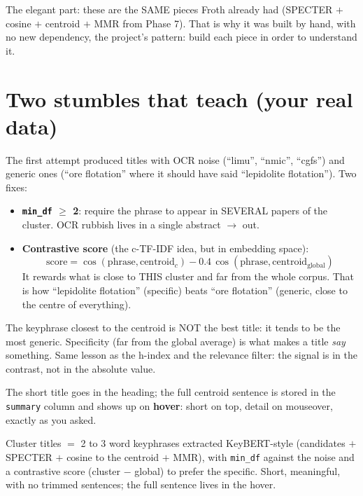 \documentclass[11pt,a4paper]{article}
\begin{document}
The elegant part: these are the SAME pieces Froth already had (SPECTER $+$ cosine $+$ centroid
$+$ MMR from Phase 7). That is why it was built by hand, with no new dependency, the project's
pattern: build each piece in order to understand it.

\section{Two stumbles that teach (your real data)}

The first attempt produced titles with OCR noise (``limu'', ``nmic'', ``cgfs'') and generic ones
(``ore flotation'' where it should have said ``lepidolite flotation''). Two fixes:

\begin{itemize}
  \item \textbf{\texttt{min\_df} $\geq$ 2}: require the phrase to appear in SEVERAL papers of
        the cluster. OCR rubbish lives in a single abstract $\to$ out.
  \item \textbf{Contrastive score} (the c-TF-IDF idea, but in embedding space):
        \[
        \mathrm{score} = \cos(\mathrm{phrase}, \mathrm{centroid}_c)
                       - 0.4 \, \cos(\mathrm{phrase}, \mathrm{centroid}_{\mathrm{global}})
        \]
        It rewards what is close to THIS cluster and far from the whole corpus. That is how
        ``lepidolite flotation'' (specific) beats ``ore flotation'' (generic, close to the
        centre of everything).
\end{itemize}

\begin{ojo}
The keyphrase closest to the centroid is NOT the best title: it tends to be the most generic.
Specificity (far from the global average) is what makes a title \emph{say} something. Same
lesson as the h-index and the relevance filter: the signal is in the contrast, not in the
absolute value.
\end{ojo}

\begin{practica}
The short title goes in the heading; the full centroid sentence is stored in the
\texttt{summary} column and shows up on \textbf{hover}: short on top, detail on mouseover,
exactly as you asked.
\end{practica}

\begin{resumen}
Cluster titles $=$ 2 to 3 word keyphrases extracted KeyBERT-style (candidates $+$ SPECTER $+$
cosine to the centroid $+$ MMR), with \texttt{min\_df} against the noise and a contrastive score
(cluster $-$ global) to prefer the specific. Short, meaningful, with no trimmed sentences; the
full sentence lives in the hover.
\end{resumen}
\clearpage
{}
{}
\end{document}
